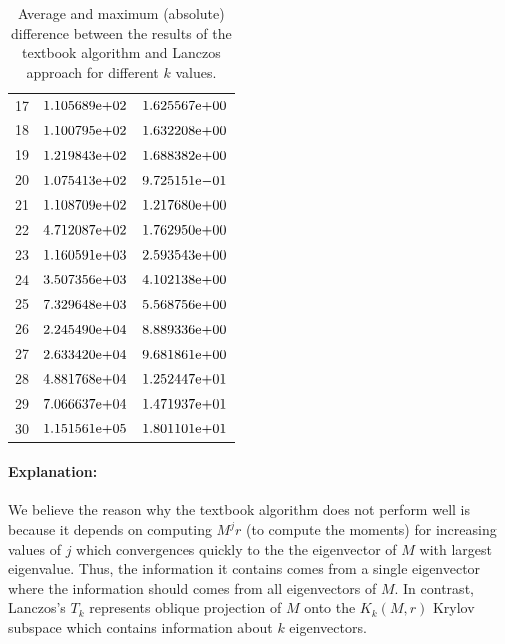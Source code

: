 \begin{table}[!tbh]
\begin{tabular}{ |p{1.5cm}| p{4cm}|| p{4cm}|}
	17  & ${1.105689}\mathrm{e}{+02}$   & ${1.625567}\mathrm{e}{+00}$   \\
	18  & ${1.100795}\mathrm{e}{+02}$   & ${1.632208}\mathrm{e}{+00}$   \\
	19  & ${1.219843}\mathrm{e}{+02}$   & ${1.688382}\mathrm{e}{+00}$   \\
	20  & ${1.075413}\mathrm{e}{+02}$   & ${9.725151}\mathrm{e}{-01}$   \\
	21  & ${1.108709}\mathrm{e}{+02}$   & ${1.217680}\mathrm{e}{+00}$   \\
	22  & ${4.712087}\mathrm{e}{+02}$   & ${1.762950}\mathrm{e}{+00}$   \\
	23  & ${1.160591}\mathrm{e}{+03}$   & ${2.593543}\mathrm{e}{+00}$   \\
	24  & ${3.507356}\mathrm{e}{+03}$   & ${4.102138}\mathrm{e}{+00}$   \\
	25  & ${7.329648}\mathrm{e}{+03}$   & ${5.568756}\mathrm{e}{+00}$   \\
	26  & ${2.245490}\mathrm{e}{+04}$   & ${8.889336}\mathrm{e}{+00}$   \\
	27  & ${2.633420}\mathrm{e}{+04}$   & ${9.681861}\mathrm{e}{+00}$   \\
	28  & ${4.881768}\mathrm{e}{+04}$   & ${1.252447}\mathrm{e}{+01}$   \\
	29  & ${7.066637}\mathrm{e}{+04}$   & ${1.471937}\mathrm{e}{+01}$   \\
	30  & ${1.151561}\mathrm{e}{+05}$   & ${1.801101}\mathrm{e}{+01}$   \\
\hline
\end{tabular} 
\caption{Average and maximum (absolute) difference between the results of the textbook algorithm and Lanczos approach for different $k$ values.}
   \label{tab:comp}
\end{table}

\paragraph{Explanation:} We believe the reason why the textbook algorithm does not perform well is because it depends on computing $M^{j}r$ (to compute the moments) for increasing values of $j$ which convergences quickly to the the eigenvector of $M$ with largest eigenvalue. Thus, the information it contains comes from a single eigenvector where the information should comes from all eigenvectors of $M$. In contrast, Lanczos's $T_{k}$ represents oblique projection of $M$ onto the $K_{k}(M,r)$ Krylov subspace which contains information about $k$ eigenvectors. 

